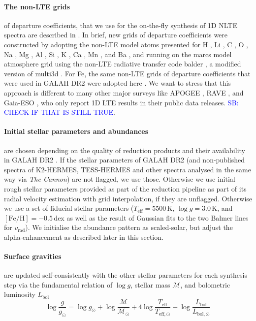 \documentclass[fleqn,usenatbib,useAMS]{mnras}
\newcommand{\logg}{$\log g$\xspace}
\newcommand{\vrad}{$v_\mathrm{rad}$\xspace}
\newcommand\SB[1]{\textcolor{blue}{SB: #1}}
\begin{document}
\paragraph*{The non-LTE grids} of departure coefficients, that we use for the on-the-fly synthesis of 1D NLTE spectra are described in \citet{Amarsi2020}. In brief, new grids of departure coefficients were constructed by adopting the non-LTE model atoms presented for H \citep{Amarsi2018}, Li \citep[][Wang et al., in prep]{Lind2009}, C \citep{Amarsi2019}, O \citep{Amarsi2018b}, Na \citep{Lind2011}, Mg \citep{Osorio2015}, Al \citep{Nordlander2017}, Si \citep{Amarsi2017}, K \citep{Reggiani2019}, Ca \citep{Osorio2019}, Mn \citep{Bergemann2019b}, and Ba \citep{Gallagher2020}, and running on the {\sc marcs} model atmosphere grid using the non-LTE radiative transfer code {\sc balder} \citep{Amarsi2018}, a modified version of {\sc multi3d} \citep{Leenaarts2009}.  For Fe, the same non-LTE grids of departure coefficients that were used in GALAH DR2 were adopted here \citep{Amarsi2016a, Lind2017}.  We want to stress that this approach is different to many other major surveys like APOGEE \citep{SDSSDR16}, RAVE \citep{Steinmetz2020b}, and Gaia-ESO \citep{Smiljanic2014}, who only report 1D LTE results in their public data releases. \SB{CHECK IF THAT IS STILL TRUE}.

\paragraph*{Initial stellar parameters and abundances} are chosen depending on the quality of reduction products and their availability in GALAH DR2 \citep{Buder2018}. If the stellar parameters of GALAH DR2 (and non-published spectra of K2-HERMES, TESS-HERMES and other spectra analysed in the same way via \textit{The Cannon}) are not flagged, we use those. Otherwise we use initial rough stellar parameters provided as part of the reduction pipeline as part of its radial velocity estimation with grid interpolation, if they are unflagged. Otherwise we use a set of fiducial stellar parameters ($T_\text{eff} = 5500\,\mathrm{K}$, $\log g = 3.0\,\mathrm{K}$, and $\mathrm{[Fe/H]} = -0.5\,\mathrm{dex}$ as well as the result of Gaussian fits to the two Balmer lines for \vrad). We initialise the abundance pattern as scaled-solar, but adjust the alpha-enhancement as described later in this section.

\paragraph*{Surface gravities} are updated self-consistently with the other stellar parameters for each synthesis step via the fundamental relation of \logg, stellar mass $\mathcal{M}$, and bolometric luminosity $L_\text{bol}$
\begin{equation}
\log \frac{g}{g_\odot} = \log g_\odot + \log \frac{\mathcal{M}}{\mathcal{M_\odot}} + 4 \log \frac{T_\mathrm{eff}}{T_\mathrm{eff,\odot}} - \log \frac{L_\mathrm{bol}}{L_\mathrm{bol,\odot}} \label{eq:logg}
\end{equation}
\end{document}
